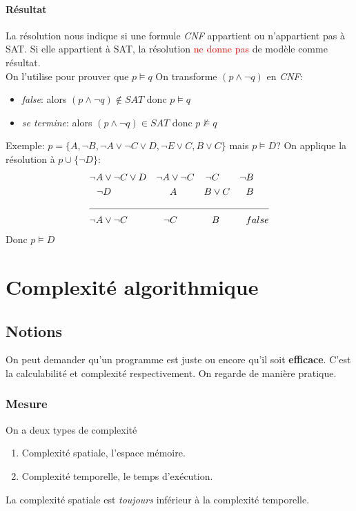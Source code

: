 \documentclass{report}
\begin{document}
\subsubsection{Résultat}
La résolution nous indique si une formule \textit{CNF} appartient ou n'appartient pas à SAT. Si elle appartient à SAT, la résolution \textcolor{red}{ne donne pas} de modèle comme résultat.\\
On l'utilise pour prouver que $p \models q$ On transforme $(p \wedge \neg q)$ en \textit{CNF}:
\begin{itemize}
\item \textit{false}: alors $(p \wedge \neg q) \notin SAT$ donc $p \models q$
\item \textit{se termine}: alors $(p \wedge \neg q) \in SAT$ donc $p \nvDash q$
\end{itemize}
Exemple: $p = \{A, \neg B, \neg A \vee \neg C \vee D, \neg E \vee C, B \vee C \}$ mais $p \models D$? On applique la résolution à $p \cup \{\neg D\}$:
\begin{align*}
\neg A &\vee \neg C \vee D & \neg A & \vee \neg C & \neg &C & \neg & B\\
\neg & D & &A & B &\vee C & & B\\
 \cline{1-8}
\neg A & \vee \neg C & \neg & C & &B & &false 
\end{align*}
Donc $p \models D$


\chapter{Complexité algorithmique}
\section{Notions}
On peut demander qu'un programme est juste ou encore qu'il soit \textbf{efficace}. C'est la calculabilité et complexité respectivement. On regarde de manière pratique.

\subsection{Mesure}
On a deux types de complexité
\begin{enumerate}
\item Complexité spatiale, l'espace mémoire.
\item Complexité temporelle, le temps d'exécution.
\end{enumerate}
La complexité spatiale est \textit{toujours} inférieur à la complexité temporelle.
\end{document}
